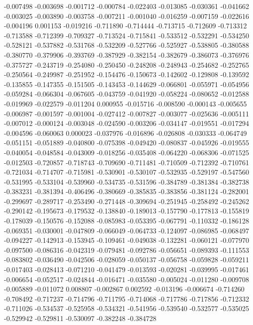 -0.007498
-0.003698
-0.001712
-0.000784
-0.022403
-0.013085
-0.030361
-0.041662
-0.003025
-0.003890
-0.003758
-0.007211
-0.001040
-0.016259
-0.007159
-0.022616
-0.004196
0.001153
-0.019216
-0.711890
-0.714444
-0.713715
-0.712609
-0.713312
-0.713588
-0.712399
-0.709327
-0.713524
-0.715841
-0.533512
-0.532291
-0.534250
-0.528121
-0.537882
-0.531768
-0.532209
-0.527766
-0.525927
-0.538805
-0.380588
-0.380770
-0.379906
-0.393769
-0.387929
-0.382154
-0.382679
-0.386073
-0.376976
-0.375727
-0.243719
-0.254080
-0.250450
-0.248208
-0.248943
-0.254682
-0.252765
-0.250564
-0.249987
-0.251952
-0.154476
-0.150673
-0.142602
-0.129808
-0.139592
-0.135855
-0.147355
-0.151505
-0.143453
-0.144629
-0.066801
-0.055971
-0.054956
-0.059284
-0.066304
-0.067605
-0.043759
-0.041920
-0.058224
-0.080652
-0.012588
-0.019969
-0.022579
-0.011204
0.000955
-0.015716
-0.008590
-0.000143
-0.005655
-0.006987
-0.001597
-0.001004
-0.027412
-0.007827
-0.003077
-0.025636
-0.005111
-0.007012
-0.000124
-0.003048
-0.024590
-0.003206
-0.034147
-0.019551
-0.017294
-0.004596
-0.060063
0.000023
-0.037976
-0.016896
-0.026808
-0.030333
-0.064749
-0.051151
-0.051889
-0.040800
-0.075398
-0.049420
-0.080837
-0.045926
-0.019555
-0.040054
-0.048584
-0.043009
-0.018256
-0.035408
-0.064220
-0.068306
-0.071525
-0.012503
-0.720857
-0.718743
-0.709690
-0.711481
-0.710509
-0.712392
-0.710761
-0.721034
-0.714707
-0.715981
-0.530901
-0.530107
-0.532935
-0.529197
-0.547560
-0.531995
-0.533104
-0.539960
-0.534735
-0.531596
-0.384789
-0.381384
-0.382738
-0.383231
-0.381394
-0.406496
-0.380669
-0.385835
-0.383856
-0.381124
-0.282001
-0.299697
-0.289717
-0.253490
-0.271448
-0.309694
-0.251945
-0.258492
-0.245262
-0.290142
-0.195673
-0.179532
-0.138840
-0.189013
-0.157790
-0.177813
-0.155819
-0.178039
-0.150576
-0.152088
-0.085983
-0.053395
-0.067791
-0.110332
-0.186128
-0.069351
-0.030001
-0.047809
-0.066049
-0.064733
-0.124097
-0.086985
-0.068497
-0.094227
-0.142913
-0.153945
-0.109461
-0.049038
-0.132281
-0.060121
-0.077970
-0.097500
-0.086316
-0.042319
-0.079481
-0.092786
-0.056651
-0.089393
-0.111553
-0.083802
-0.036490
-0.042506
-0.028059
-0.050137
-0.056758
-0.059828
-0.059211
-0.017403
-0.028413
-0.071210
-0.041479
-0.013593
-0.020281
-0.039995
-0.017461
-0.006654
-0.052517
-0.024844
-0.016471
-0.035580
-0.005024
-0.011280
-0.009708
-0.005889
-0.011072
0.008807
-0.002867
0.002592
-0.013196
-0.006674
-0.714260
-0.708492
-0.717237
-0.714796
-0.711795
-0.714068
-0.717786
-0.717856
-0.712332
-0.711026
-0.534537
-0.525958
-0.534321
-0.541956
-0.539540
-0.532577
-0.535025
-0.529942
-0.529811
-0.530097
-0.382248
-0.384728
